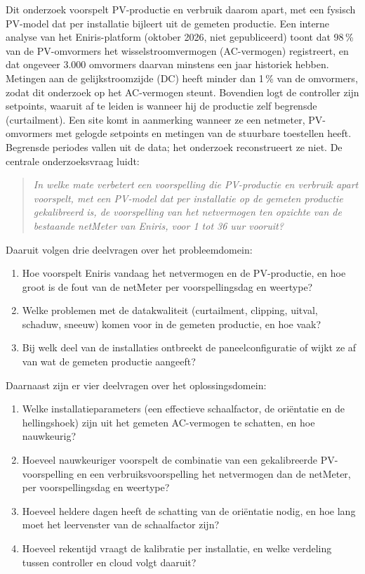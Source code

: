 Dit onderzoek voorspelt PV-productie en verbruik daarom apart, met een fysisch PV-model dat per installatie bijleert uit de gemeten productie. Een interne analyse van het Eniris-platform (oktober 2026, niet gepubliceerd) toont dat 98\,\% van de PV-omvormers het wisselstroomvermogen (AC-vermogen) registreert, en dat ongeveer 3.000 omvormers daarvan minstens een jaar historiek hebben. Metingen aan de gelijkstroomzijde (DC) heeft minder dan 1\,\% van de omvormers, zodat dit onderzoek op het AC-vermogen steunt. Bovendien logt de controller zijn setpoints, waaruit af te leiden is wanneer hij de productie zelf begrensde (curtailment). Een site komt in aanmerking wanneer ze een netmeter, PV-omvormers met gelogde setpoints en metingen van de stuurbare toestellen heeft. Begrensde periodes vallen uit de data; het onderzoek reconstrueert ze niet. De centrale onderzoeksvraag luidt:

\begin{quote}
\textit{In welke mate verbetert een voorspelling die PV-productie en verbruik apart voorspelt, met een PV-model dat per installatie op de gemeten productie gekalibreerd is, de voorspelling van het netvermogen ten opzichte van de bestaande netMeter van Eniris, voor 1 tot 36 uur vooruit?}
\end{quote}

\noindent Daaruit volgen drie deelvragen over het probleemdomein:

\begin{enumerate}
  \item[P1.] Hoe voorspelt Eniris vandaag het netvermogen en de PV-productie, en hoe groot is de fout van de netMeter per voorspellingsdag en weertype?
  \item[P2.] Welke problemen met de datakwaliteit (curtailment, clipping, uitval, schaduw, sneeuw) komen voor in de gemeten productie, en hoe vaak?
  \item[P3.] Bij welk deel van de installaties ontbreekt de paneelconfiguratie of wijkt ze af van wat de gemeten productie aangeeft?
\end{enumerate}

\noindent Daarnaast zijn er vier deelvragen over het oplossingsdomein:

\begin{enumerate}
  \item[O1.] Welke installatieparameters (een effectieve schaalfactor, de oriëntatie en de hellingshoek) zijn uit het gemeten AC-vermogen te schatten, en hoe nauwkeurig?
  \item[O2.] Hoeveel nauwkeuriger voorspelt de combinatie van een gekalibreerde PV-voorspelling en een verbruiksvoorspelling het netvermogen dan de netMeter, per voorspellingsdag en weertype?
  \item[O3.] Hoeveel heldere dagen heeft de schatting van de oriëntatie nodig, en hoe lang moet het leervenster van de schaalfactor zijn?
  \item[O4.] Hoeveel rekentijd vraagt de kalibratie per installatie, en welke verdeling tussen controller en cloud volgt daaruit?
\end{enumerate}


